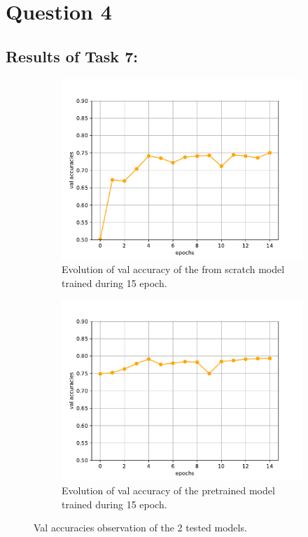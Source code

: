 \documentclass[a4paper]{article}
\begin{document}
\section*{Question 4}
    \subsection*{Results of Task 7:}
    \begin{figure}[htp]
        \centering
        \begin{subfigure}[b]{0.45\textwidth}
            \centering
            \includegraphics[width=\textwidth]{../figures/from_scratch_valaccs.pdf}
            \caption{Evolution of val accuracy of the from scratch model trained during 15 epoch.}
            \label{fig:image1}
        \end{subfigure}
        \hfill
        \begin{subfigure}[b]{0.45\textwidth}
            \centering
            \includegraphics[width=\textwidth]{../figures/pretrained_valaccs.pdf}
            \caption{Evolution of val accuracy of the pretrained model trained during 15 epoch.}
            \label{fig:image2}
        \end{subfigure}
        \caption{Val accuracies observation of the 2 tested models.}
        \label{fig:figure}
    \end{figure}
\end{document}
